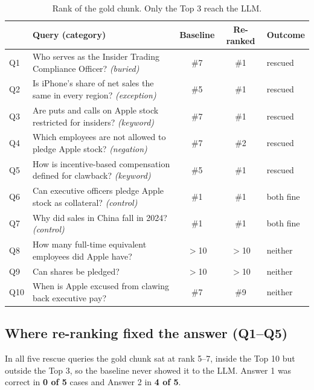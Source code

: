 \documentclass[10pt,a4paper]{article}
\begin{document}
\begin{table}[h]
\centering\small
\caption{Rank of the gold chunk. Only the Top 3 reach the LLM.}\label{tab:ranks}
\begin{tabular}{llcc l}
\toprule
 & Query (category) & Baseline & Re-ranked & Outcome \\
\midrule
Q1 & Who serves as the Insider Trading Compliance Officer? \textit{(buried)} & \#7 & \#1 & rescued \\
Q2 & Is iPhone's share of net sales the same in every region? \textit{(exception)} & \#5 & \#1 & rescued \\
Q3 & Are puts and calls on Apple stock restricted for insiders? \textit{(keyword)} & \#7 & \#1 & rescued \\
Q4 & Which employees are not allowed to pledge Apple stock? \textit{(negation)} & \#7 & \#2 & rescued \\
Q5 & How is incentive-based compensation defined for clawback? \textit{(keyword)} & \#5 & \#1 & rescued \\
\midrule
Q6 & Can executive officers pledge Apple stock as collateral? \textit{(control)} & \#1 & \#1 & both fine \\
Q7 & Why did sales in China fall in 2024? \textit{(control)} & \#1 & \#1 & both fine \\
\midrule
Q8 & How many full-time equivalent employees did Apple have? & $>$10 & $>$10 & neither \\
Q9 & Can shares be pledged? & $>$10 & $>$10 & neither \\
Q10 & When is Apple excused from clawing back executive pay? & \#7 & \#9 & neither \\
\bottomrule
\end{tabular}
\end{table}

\subsection*{Where re-ranking fixed the answer (Q1--Q5)}

In all five rescue queries the gold chunk sat at rank 5--7, inside the Top 10 but outside
the Top 3, so the baseline never showed it to the LLM. Answer 1 was correct in \textbf{0 of 5}
cases and Answer 2 in \textbf{4 of 5}.
\end{document}
